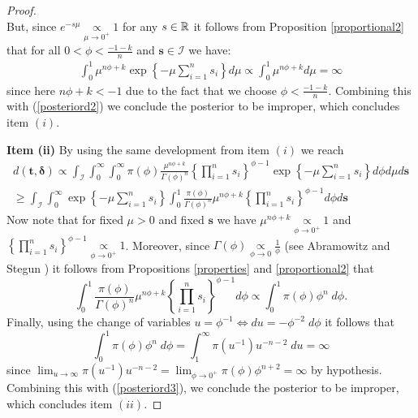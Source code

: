 \begin{proof}
\begin{equation}
\end{equation}
But, since $e^{-s\mu} \underset{\mu \to 0^+}{\propto} 1$ for any $s\in\mathbb{R}$ it follows from Proposition \ref{proportional2} that for all $0<\phi<\frac{-1-k}{n}$ and $\boldsymbol{s}\in \mathcal{I}$ we have:
\begin{equation*}
 \begin{aligned}
\int_0^1 \mu^{n\phi+k}\exp\left\{-\mu\sum_{i=1}^n s_i\right\} d\mu
\propto \int_0^1 \mu^{n\phi+k} d\mu = \infty
\end{aligned}
\end{equation*}
since here $n\phi+k<-1$ due to the fact that we choose $\phi<\frac{-1-k}{n}$. Combining this with (\ref{posteriord2}) we conclude the posterior to be improper, which concludes item $(i)$.

\vspace{0.3cm}
\noindent \textbf{Item (ii)} By using the same development from item $(i)$ we reach
 \begin{equation}
 \begin{aligned}
 \label{posteriord3}
d(\boldsymbol{t,\delta})\propto \int_{\mathcal{I}} \int_{0}^{\infty}\int_{0}^{\infty}\pi(\phi)\frac{\mu^{n\phi+k}}{\Gamma(\phi)^n}\left\{\prod_{i=1}^n{s_i}\right\}^{\phi-1}\exp\left\{-\mu\sum_{i=1}^n s_i\right\}d\phi d\mu d\boldsymbol{s} \\
\geq \int_{\mathcal{I}} \int_{0}^{\infty}\exp\left\{-\mu\sum_{i=1}^n s_i\right\}     \int_{0}^{1}\frac{\pi(\phi)}{\Gamma(\phi)^n}\mu^{n\phi+k}\left\{\prod_{i=1}^n{s_i}\right\}^{\phi-1} d\phi  d\boldsymbol{s}
\end{aligned}
\end{equation}
Now note that for fixed $\mu>0$ and fixed $\boldsymbol{s}$ we have $\mu^{n\phi+k}\underset{\phi\to 0^+}{\propto} 1$ and $\left\{\prod_{i=1}^n{s_i}\right\}^{\phi-1}\underset{\phi\to 0^+}{\propto} 1$. Moreover, since $\Gamma(\phi)\underset{\phi \to 0}{\propto} \frac{1}{\phi}$ (see Abramowitz and Stegun \cite{abramowitz}) it follows from Propositions \ref{properties} and \ref{proportional2} that
\begin{equation*}
\int_{0}^{1}\frac{\pi(\phi)}{\Gamma(\phi)^n}\mu^{n\phi+k}\left\{\prod_{i=1}^n{s_i}\right\}^{\phi-1} d\phi  \propto \int_{0}^{1}\pi(\phi)\phi^n\; d\phi.
\end{equation*}
Finally, using the change of variables $u=\phi^{-1}\Leftrightarrow du=-\phi^{-2}\; d\phi$ it follows that
\begin{equation*} \int_{0}^{1}\pi(\phi)\phi^n\; d\phi = \int_1^\infty \pi(u^{-1})u^{-n-2}\; du = \infty
\end{equation*}
since $\lim_{u\to \infty} \pi(u^{-1})u^{-n-2} = \lim_{\phi\to 0^+} \pi(\phi)\phi^{n+2} = \infty$ by hypothesis. Combining this with (\ref{posteriord3}), we conclude the posterior to be improper, which concludes item $(ii)$.


\end{proof}
